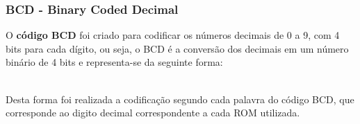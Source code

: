 \documentclass[12pt,a4paper,portrait]{article}
\begin{document}
			\subsubsection{BCD - Binary Coded Decimal} \label{sssec:bcd}
				O \cite{Garroz}\textbf{código BCD} foi criado para codificar os números decimais de 0 a 9, com 4 bits para cada dígito, ou seja, o BCD é a conversão dos decimais em um número binário de 4 bits e representa-se da seguinte forma:
				\begin{table}[!h]
					\centering
					\caption{Tabela BCD}
					\label{my-label}
				\end{table}\\
				Desta forma foi realizada a codificação segundo cada palavra do código BCD, que corresponde ao digito decimal correspondente a cada ROM utilizada.\\
\end{document}
